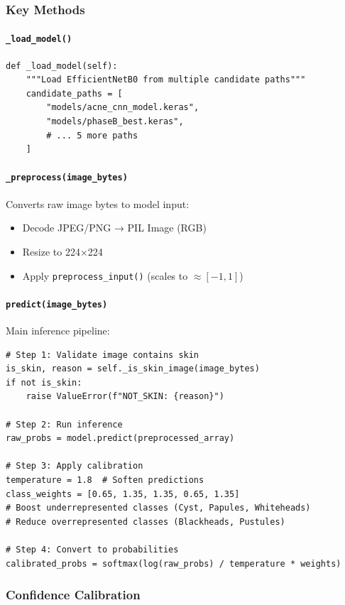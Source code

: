 \documentclass[12pt,a4paper]{article}
\begin{document}
\subsubsection{Key Methods}

\paragraph{\texttt{\_load\_model()}}
\begin{lstlisting}
def _load_model(self):
    """Load EfficientNetB0 from multiple candidate paths"""
    candidate_paths = [
        "models/acne_cnn_model.keras",
        "models/phaseB_best.keras",
        # ... 5 more paths
    ]
\end{lstlisting}

\paragraph{\texttt{\_preprocess(image\_bytes)}}
Converts raw image bytes to model input:
\begin{itemize}
    \item Decode JPEG/PNG → PIL Image (RGB)
    \item Resize to 224×224
    \item Apply \texttt{preprocess\_input()} (scales to $\approx [-1, 1]$)
\end{itemize}

\paragraph{\texttt{predict(image\_bytes)}}
Main inference pipeline:
\begin{lstlisting}
# Step 1: Validate image contains skin
is_skin, reason = self._is_skin_image(image_bytes)
if not is_skin:
    raise ValueError(f"NOT_SKIN: {reason}")

# Step 2: Run inference
raw_probs = model.predict(preprocessed_array)

# Step 3: Apply calibration
temperature = 1.8  # Soften predictions
class_weights = [0.65, 1.35, 1.35, 0.65, 1.35]
# Boost underrepresented classes (Cyst, Papules, Whiteheads)
# Reduce overrepresented classes (Blackheads, Pustules)

# Step 4: Convert to probabilities
calibrated_probs = softmax(log(raw_probs) / temperature * weights)
\end{lstlisting}

\subsubsection{Confidence Calibration}
\end{document}
